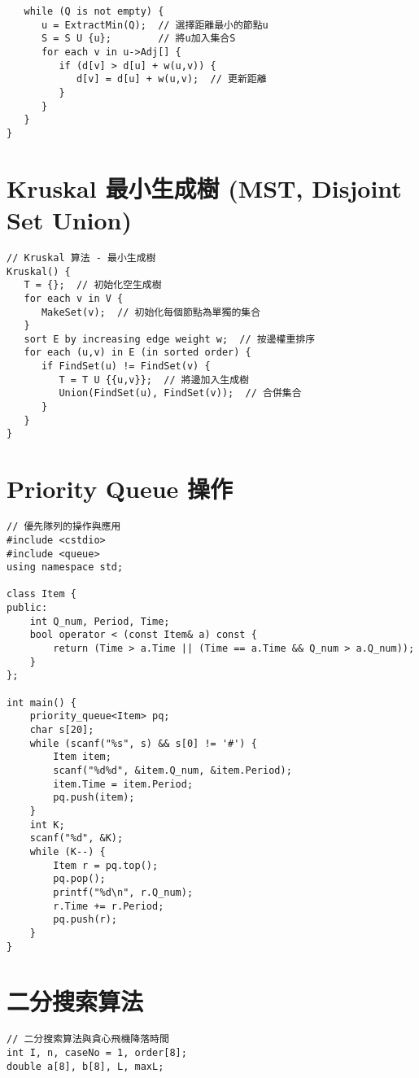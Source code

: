 \documentclass{article}
\begin{document}
\begin{multicols}{2}
\begin{lstlisting}
   while (Q is not empty) {
      u = ExtractMin(Q);  // 選擇距離最小的節點u
      S = S U {u};        // 將u加入集合S
      for each v in u->Adj[] {
         if (d[v] > d[u] + w(u,v)) {
            d[v] = d[u] + w(u,v);  // 更新距離
         }
      }
   }
}
\end{lstlisting}

\section{Kruskal 最小生成樹 (MST, Disjoint Set Union)}

\begin{lstlisting}
// Kruskal 算法 - 最小生成樹
Kruskal() {
   T = {};  // 初始化空生成樹
   for each v in V {
      MakeSet(v);  // 初始化每個節點為單獨的集合
   }
   sort E by increasing edge weight w;  // 按邊權重排序
   for each (u,v) in E (in sorted order) {
      if FindSet(u) != FindSet(v) {
         T = T U {{u,v}};  // 將邊加入生成樹
         Union(FindSet(u), FindSet(v));  // 合併集合
      }
   }
}
\end{lstlisting}

\section{Priority Queue 操作}

\begin{lstlisting}
// 優先隊列的操作與應用
#include <cstdio>
#include <queue>
using namespace std;

class Item {     
public:
    int Q_num, Period, Time;
    bool operator < (const Item& a) const {
        return (Time > a.Time || (Time == a.Time && Q_num > a.Q_num));
    }
};

int main() {       
    priority_queue<Item> pq;
    char s[20];
    while (scanf("%s", s) && s[0] != '#') {
        Item item;
        scanf("%d%d", &item.Q_num, &item.Period);
        item.Time = item.Period;
        pq.push(item);
    }
    int K;
    scanf("%d", &K);
    while (K--) {
        Item r = pq.top();
        pq.pop();
        printf("%d\n", r.Q_num);
        r.Time += r.Period;
        pq.push(r);
    }
}
\end{lstlisting}

\section{二分搜索算法}

\begin{lstlisting}
// 二分搜索算法與貪心飛機降落時間
int I, n, caseNo = 1, order[8]; 
double a[8], b[8], L, maxL;


\end{lstlisting}
\end{multicols}
\end{document}
